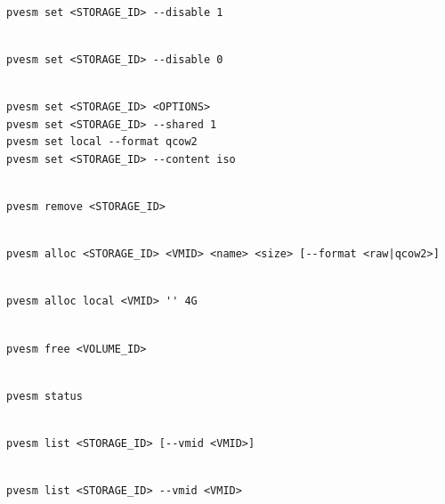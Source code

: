 \begin{lstlisting}

pvesm set <STORAGE_ID> --disable 1

\end{lstlisting}

\begin{lstlisting}

pvesm set <STORAGE_ID> --disable 0

\end{lstlisting}

\begin{lstlisting}

pvesm set <STORAGE_ID> <OPTIONS>
pvesm set <STORAGE_ID> --shared 1
pvesm set local --format qcow2
pvesm set <STORAGE_ID> --content iso

\end{lstlisting}

\begin{lstlisting}

pvesm remove <STORAGE_ID>

\end{lstlisting}

\begin{lstlisting}

pvesm alloc <STORAGE_ID> <VMID> <name> <size> [--format <raw|qcow2>]

\end{lstlisting}

\begin{lstlisting}

pvesm alloc local <VMID> '' 4G

\end{lstlisting}

\begin{lstlisting}

pvesm free <VOLUME_ID>

\end{lstlisting}

\begin{lstlisting}

pvesm status

\end{lstlisting}

\begin{lstlisting}

pvesm list <STORAGE_ID> [--vmid <VMID>]

\end{lstlisting}

\begin{lstlisting}

pvesm list <STORAGE_ID> --vmid <VMID>

\end{lstlisting}

